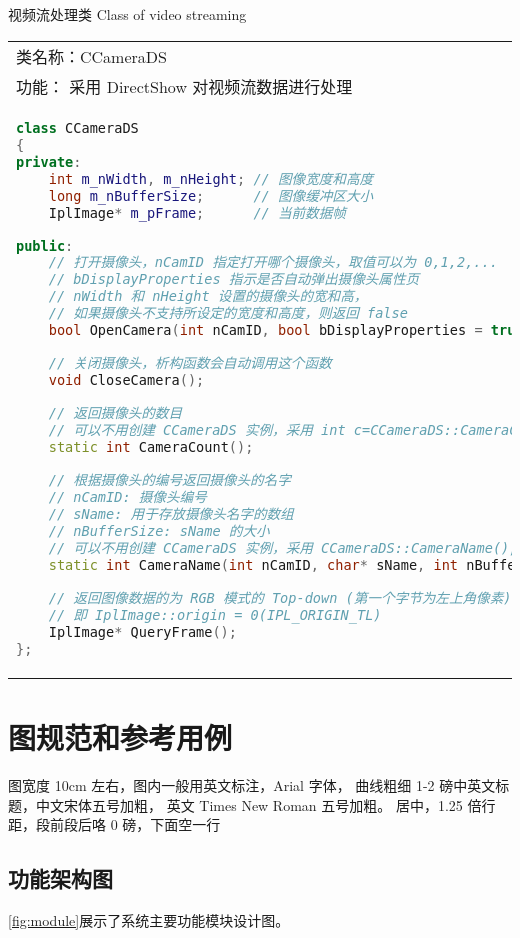 \documentclass[12pt]{zjutthesis}
\begin{document}
\begin{table}[htp]
  \centering
  \bicaption
    {视频流处理类}
    {Class of video streaming}
  \begin{tabular}{|p{}|}
    \hline
    类名称：CCameraDS                       \\
    功能： 采用 DirectShow 对视频流数据进行处理 \\
    \hline
    \begin{lstlisting}[language=C++]
class CCameraDS
{
private:
    int m_nWidth, m_nHeight; // 图像宽度和高度
    long m_nBufferSize;      // 图像缓冲区大小
    IplImage* m_pFrame;      // 当前数据帧

public:
    // 打开摄像头，nCamID 指定打开哪个摄像头，取值可以为 0,1,2,...
    // bDisplayProperties 指示是否自动弹出摄像头属性页
    // nWidth 和 nHeight 设置的摄像头的宽和高，
    // 如果摄像头不支持所设定的宽度和高度，则返回 false
    bool OpenCamera(int nCamID, bool bDisplayProperties = true, int nWidth = 640, int nHeight = 480);

    // 关闭摄像头，析构函数会自动调用这个函数
    void CloseCamera();

    // 返回摄像头的数目
    // 可以不用创建 CCameraDS 实例，采用 int c=CCameraDS::CameraCount();得到结果。
    static int CameraCount();

    // 根据摄像头的编号返回摄像头的名字
    // nCamID: 摄像头编号
    // sName: 用于存放摄像头名字的数组
    // nBufferSize: sName 的大小
    // 可以不用创建 CCameraDS 实例，采用 CCameraDS::CameraName();得到结果。
    static int CameraName(int nCamID, char* sName, int nBufferSize);

    // 返回图像数据的为 RGB 模式的 Top-down (第一个字节为左上角像素)
    // 即 IplImage::origin = 0(IPL_ORIGIN_TL)
    IplImage* QueryFrame();
};
    \end{lstlisting} \\
    \hline
  \end{tabular}
\end{table}


\section{图规范和参考用例}
图宽度 10cm 左右，图内一般用英文标注，Arial 字体，
曲线粗细 1-2 磅中英文标题，中文宋体五号加粗，
英文 Times New Roman 五号加粗。
居中，1.25 倍行距，段前段后咯 0 磅，下面空一行

\subsection{功能架构图}
\autoref{fig:module}展示了系统主要功能模块设计图。
\end{document}
